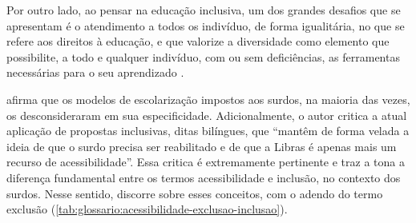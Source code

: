 Por outro lado, ao pensar na educação inclusiva, um dos grandes desafios que se apresentam é o atendimento a todos os indivíduo, de forma igualitária, no que se refere aos direitos à educação, e que valorize a diversidade como elemento que possibilite, a todo e qualquer indivíduo, com ou sem deficiências, as ferramentas necessárias para o seu aprendizado \cite{Almeida2015}.

 afirma que os modelos de escolarização impostos aos surdos, na maioria das vezes, os desconsideraram em sua especificidade. Adicionalmente, o autor critica a atual aplicação de propostas inclusivas, ditas bilíngues, que ``mantêm de forma velada a ideia de que o surdo precisa ser reabilitado e de que a Libras é apenas mais um recurso de acessibilidade''. Essa critica é extremamente pertinente e traz a tona a diferença fundamental entre os termos acessibilidade e inclusão, no contexto dos surdos. Nesse sentido,  discorre sobre esses conceitos, com o adendo do termo exclusão (\autoref{tab:glossario:acessibilidade-exclusao-inclusao}).

